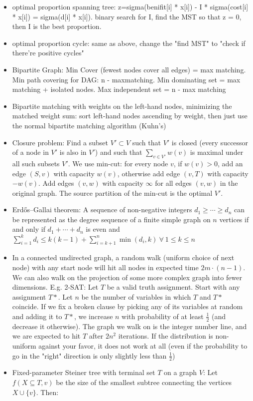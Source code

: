 \begin{itemize}
\item optimal proportion spanning tree: z=sigma(benifit[i] * x[i]) - I * sigma(cost[i] * x[i]) = sigma(d[i] * x[i]). binary search for I, find the MST so that z = 0, then I is the best proportion.
\item optimal proportion cycle: same as above, change the "find MST" to "check if there're positive cycles"
\item Bipartite Graph: Min Cover (fewest nodes cover all edges) = max matching. Min path covering for DAG: n - maxmatching. Min dominating set = max matching + isolated nodes. Max independent set = n - max matching
\item Bipartite matching with weights on the left-hand nodes, minimizing the matched weight sum:
      sort left-hand nodes ascending by weight, then just use the normal bipartite matching algorithm (Kuhn's)
\item Closure problem: Find a subset $V' \subset V$ such that $V'$ is closed (every successor of a node in $V'$ is also in $V'$) and such that $\sum_{v \in V'} w(v)$ is maximal under all such subsets $V'$. We use min-cut: for every node $v$, if $w(v) > 0$, add an edge $(S, v)$ with capacity $w(v)$, otherwise add edge $(v,T)$ with capacity $-w(v)$. Add edges $(v,w)$ with capacity $\infty$ for all edges $(v,w)$ in the original graph. The source partition of the min-cut is the optimal $V'$.
\item Erdős–Gallai theorem: A sequence of non-negative integers $d_1\geq\cdots\geq d_n$ can be represented as the degree sequence of a finite simple graph on $n$ vertices if and only if $d_1+\cdots+d_n$ is even and $\sum^{k}_{i=1}d_i\leq k(k-1)+ \sum^n_{i=k+1} \min(d_i,k) \ \forall\ 1 \leq k \leq n$
\item In a connected undirected graph, a random walk (uniform choice of next node) with any start node will hit all nodes in expected time $2m\cdot (n-1)$. We can also walk on the projection of some more complex graph into fewer dimensions. E.g. 2-SAT: Let $T$ be a valid truth assignment. Start with any assignment $T*$. Let $n$ be the number of variables in which $T$ and $T*$ coincide. If we fix a broken clause by picking any of its variables at random and adding it to $T*$, we increase $n$ with probability of at least $\frac{1}{2}$ (and decrease it otherwise). The graph we walk on is the integer number line, and we are expected to hit $T$ after $2n^2$ iterations. If the distribution is non-uniform against your favor, it does not work at all (even if the probability to go in the "right" direction is only slightly less than $\frac{1}{2}$)
\item Fixed-parameter Steiner tree with terminal set $T$ on a graph $V$: Let $f(X \subseteq T, v)$ be the size of the 
smallest subtree connecting the vertices $X \cup \{v\}$. Then:


\end{itemize}

